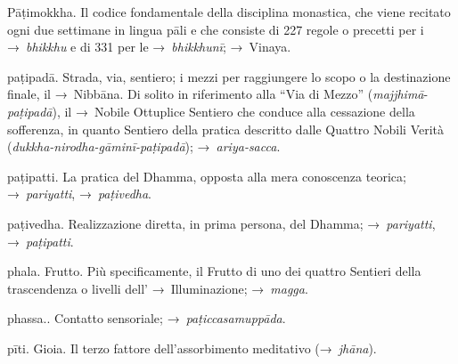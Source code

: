 \begin{glossarydescription}
\item[Pāṭimokkha.] Il codice fondamentale della disciplina monastica, che
  viene recitato ogni due settimane in lingua pāli e che consiste di 227 regole
  o precetti per i →~\emph{bhikkhu} e di 331 per le →~\emph{bhikkhunī};
  →~Vinaya.

\item[paṭipadā.] Strada, via, sentiero; i mezzi per raggiungere lo scopo o
  la destinazione finale, il →~Nibbāna. Di solito in riferimento alla
  ``Via di Mezzo'' (\emph{majjhimā}-\emph{paṭipadā}), il →~Nobile Ottuplice
  Sentiero che conduce alla cessazione della sofferenza, in quanto Sentiero
  della pratica descritto dalle Quattro Nobili Verità
  (\emph{dukkha-nirodha-gāminī-paṭipadā}); →~\emph{ariya-sacca}.

\item[paṭipatti.] La pratica del Dhamma, opposta alla mera conoscenza
  teorica; →~\emph{pariyatti}, →~\emph{paṭivedha}.

\item[paṭivedha.] Realizzazione diretta, in prima persona, del Dhamma;
  →~\emph{pariyatti}, →~\emph{paṭipatti}.

\item[phala.] Frutto. Più specificamente, il Frutto di uno dei quattro
  Sentieri della trascendenza o livelli dell' →~Illuminazione; →~\emph{magga}.

\item[phassa..] Contatto sensoriale; →~\emph{paṭiccasamuppāda}.

\item[pīti.] Gioia. Il terzo fattore dell'assorbimento meditativo
  (→~\emph{jhāna}).


\end{glossarydescription}
